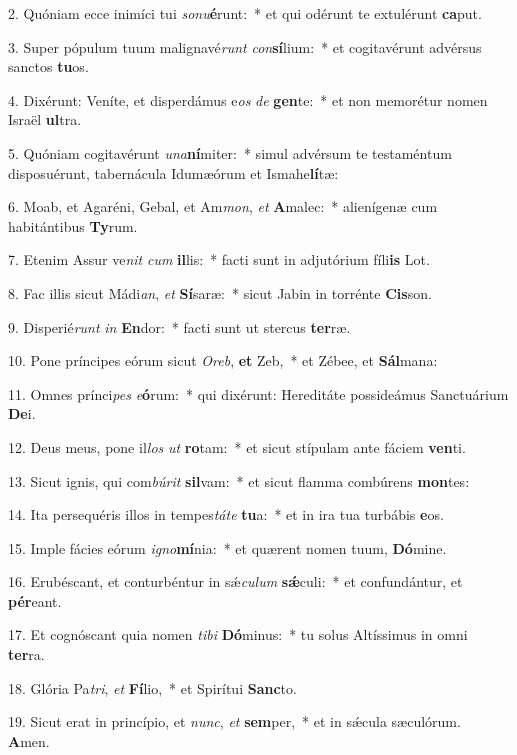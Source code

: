 2. Quóniam ecce inimíci tui \textit{so}\textit{nu}\textbf{é}runt:~*  et qui odérunt te extulérunt \textbf{ca}put.\

3. Super pópulum tuum malignavé\textit{runt} \textit{con}\textbf{sí}lium:~*  et cogitavérunt advérsus sanctos \textbf{tu}os.\

4. Dixérunt: Veníte, et disperdámus e\textit{os} \textit{de} \textbf{gen}te:~*  et non memorétur nomen Israël \textbf{ul}tra.\

5. Quóniam cogitavérunt \textit{u}\textit{na}\textbf{ní}miter:~*  simul advérsum te testaméntum disposuérunt, tabernácula Idumæórum et Ismahe\textbf{lí}tæ:\

6. Moab, et Agaréni, Gebal, et Am\textit{mon}, \textit{et} \textbf{A}malec:~*  alienígenæ cum habitántibus \textbf{Ty}rum.\

7. Etenim Assur ve\textit{nit} \textit{cum} \textbf{il}lis:~*  facti sunt in adjutórium fíli\textbf{is} Lot.\

8. Fac illis sicut Mádi\textit{an}, \textit{et} \textbf{Sí}saræ:~*  sicut Jabin in torrénte \textbf{Cis}son.\

9. Disperié\textit{runt} \textit{in} \textbf{En}dor:~*  facti sunt ut stercus \textbf{ter}ræ.\

10. Pone príncipes eórum sicut \textit{O}\textit{reb}, \textbf{et} Zeb,~*  et Zébee, et \textbf{Sál}mana:\

11. Omnes prínci\textit{pes} \textit{e}\textbf{ó}rum:~*  qui dixérunt: Hereditáte possideámus Sanctuárium \textbf{De}i.\

12. Deus meus, pone il\textit{los} \textit{ut} \textbf{ro}tam:~*  et sicut stípulam ante fáciem \textbf{ven}ti.\

13. Sicut ignis, qui com\textit{bú}\textit{rit} \textbf{sil}vam:~*  et sicut flamma combúrens \textbf{mon}tes:\

14. Ita persequéris illos in tempes\textit{tá}\textit{te} \textbf{tu}a:~*  et in ira tua turbábis \textbf{e}os.\

15. Imple fácies eórum \textit{i}\textit{gno}\textbf{mí}nia:~*  et quærent nomen tuum, \textbf{Dó}mine.\

16. Erubéscant, et conturbéntur in sǽ\textit{cu}\textit{lum} \textbf{sǽ}culi:~*  et confundántur, et \textbf{pér}eant.\

17. Et cognóscant quia nomen \textit{ti}\textit{bi} \textbf{Dó}minus:~*  tu solus Altíssimus in omni \textbf{ter}ra.\

18. Glória Pa\textit{tri}, \textit{et} \textbf{Fí}lio,~*  et Spirítui \textbf{Sanc}to.\

19. Sicut erat in princípio, et \textit{nunc}, \textit{et} \textbf{sem}per,~*  et in sǽcula sæculórum. \textbf{A}men.\

